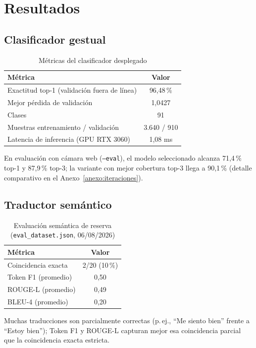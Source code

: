 \documentclass[12pt,a4paper]{report}
\begin{document}
\section{Resultados}
\subsection{Clasificador gestual}
\begin{table}[H]
\centering
\caption{Métricas del clasificador desplegado}
\label{tab:metricas_clf}
\begin{tabular}{@{}lc@{}}
\toprule
\textbf{Métrica} & \textbf{Valor} \\
\midrule
Exactitud top-1 (validación fuera de línea) & 96,48\,\% \\
Mejor pérdida de validación & 1,0427 \\
Clases & 91 \\
Muestras entrenamiento / validación & 3.640 / 910 \\
Latencia de inferencia (GPU RTX 3060) & 1,08 ms \\
\bottomrule
\end{tabular}
\end{table}

En evaluación con cámara web (\texttt{--eval}), el modelo seleccionado alcanza 71,4\,\% top-1 y 87,9\,\% top-3; la variante con mejor cobertura top-3 llega a 90,1\,\% (detalle comparativo en el Anexo~\ref{anexo:iteraciones}).

\subsection{Traductor semántico}
\begin{table}[H]
\centering
\caption{Evaluación semántica de reserva (\texttt{eval\_dataset.json}, 06/08/2026)}
\label{tab:metricas_sem}
\begin{tabular}{@{}lc@{}}
\toprule
\textbf{Métrica} & \textbf{Valor} \\
\midrule
Coincidencia exacta & 2/20 (10\,\%) \\
Token F1 (promedio) & 0,50 \\
ROUGE-L (promedio) & 0,49 \\
BLEU-4 (promedio) & 0,20 \\
\bottomrule
\end{tabular}
\end{table}

Muchas traducciones son parcialmente correctas (p.\,ej., ``Me siento bien'' frente a ``Estoy bien''); Token F1 y ROUGE-L capturan mejor esa coincidencia parcial que la coincidencia exacta estricta.
\end{document}
